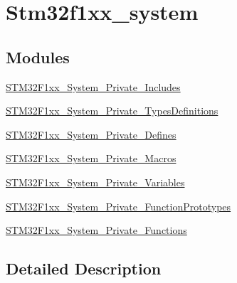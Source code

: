 \hypertarget{group__stm32f1xx__system}{}\section{Stm32f1xx\+\_\+system}
\label{group__stm32f1xx__system}
\subsection*{Modules}
\begin{DoxyCompactItemize}
\item 
\mbox{\hyperlink{group__STM32F1xx__System__Private__Includes}{S\+T\+M32\+F1xx\+\_\+\+System\+\_\+\+Private\+\_\+\+Includes}}
\item 
\mbox{\hyperlink{group__STM32F1xx__System__Private__TypesDefinitions}{S\+T\+M32\+F1xx\+\_\+\+System\+\_\+\+Private\+\_\+\+Types\+Definitions}}
\item 
\mbox{\hyperlink{group__STM32F1xx__System__Private__Defines}{S\+T\+M32\+F1xx\+\_\+\+System\+\_\+\+Private\+\_\+\+Defines}}
\item 
\mbox{\hyperlink{group__STM32F1xx__System__Private__Macros}{S\+T\+M32\+F1xx\+\_\+\+System\+\_\+\+Private\+\_\+\+Macros}}
\item 
\mbox{\hyperlink{group__STM32F1xx__System__Private__Variables}{S\+T\+M32\+F1xx\+\_\+\+System\+\_\+\+Private\+\_\+\+Variables}}
\item 
\mbox{\hyperlink{group__STM32F1xx__System__Private__FunctionPrototypes}{S\+T\+M32\+F1xx\+\_\+\+System\+\_\+\+Private\+\_\+\+Function\+Prototypes}}
\item 
\mbox{\hyperlink{group__STM32F1xx__System__Private__Functions}{S\+T\+M32\+F1xx\+\_\+\+System\+\_\+\+Private\+\_\+\+Functions}}
\end{DoxyCompactItemize}


\subsection{Detailed Description}

